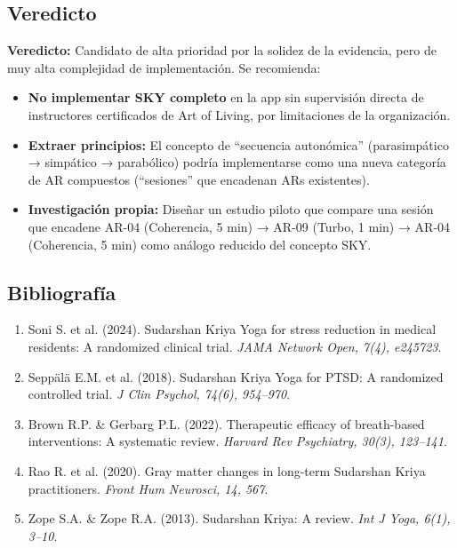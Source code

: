 \documentclass[12pt,a4paper]{article}
\newcommand{\veredicto}[1]{\textbf{Veredicto:} #1}
\begin{document}
\subsection{Veredicto}

\veredicto{Candidato de alta prioridad por la solidez de la evidencia,
pero de muy alta complejidad de implementación. Se recomienda:}

\begin{itemize}
    \item \textbf{No implementar SKY completo} en la app sin supervisión
          directa de instructores certificados de Art of Living, por
          limitaciones de la organización.
    \item \textbf{Extraer principios:} El concepto de ``secuencia
          autonómica'' (parasimpático → simpático → parabólico) podría
          implementarse como una nueva categoría de AR compuestos
          (``sesiones'' que encadenan ARs existentes).
    \item \textbf{Investigación propia:} Diseñar un estudio piloto que
          compare una sesión que encadene AR-04 (Coherencia, 5 min) →
          AR-09 (Turbo, 1 min) → AR-04 (Coherencia, 5 min) como análogo
          reducido del concepto SKY.
\end{itemize}

\subsection{Bibliografía}

\begin{enumerate}
    \item Soni S. et al. (2024). Sudarshan Kriya Yoga for stress
          reduction in medical residents: A randomized clinical trial.
          \textit{JAMA Network Open, 7(4), e245723}.
    \item Seppälä E.M. et al. (2018). Sudarshan Kriya Yoga for PTSD:
          A randomized controlled trial. \textit{J Clin Psychol, 74(6),
          954--970}.
    \item Brown R.P. \& Gerbarg P.L. (2022). Therapeutic efficacy of
          breath-based interventions: A systematic review.
          \textit{Harvard Rev Psychiatry, 30(3), 123--141}.
    \item Rao R. et al. (2020). Gray matter changes in long-term
          Sudarshan Kriya practitioners. \textit{Front Hum Neurosci,
          14, 567}.
    \item Zope S.A. \& Zope R.A. (2013). Sudarshan Kriya: A review.
          \textit{Int J Yoga, 6(1), 3--10}.
\end{enumerate}
\end{document}
